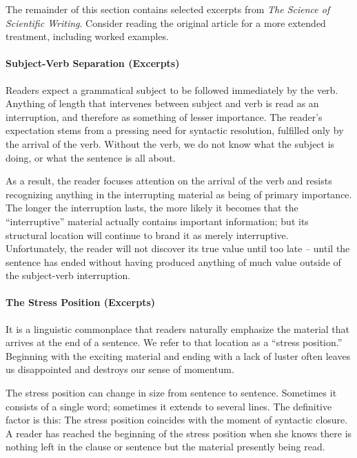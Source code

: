 The remainder of this section contains selected excerpts from \emph{The Science of Scientific Writing}. Consider reading the original article for a more extended treatment, including worked examples.

\paragraph{Subject-Verb Separation (Excerpts)}

  Readers expect a grammatical subject to be followed immediately by the verb. Anything of length that intervenes between subject and verb is read as an interruption, and therefore as something of lesser importance.
The reader’s expectation stems from a pressing need for syntactic resolution, fulfilled only by the arrival of the verb. Without the verb, we do not know what the subject is doing, or what the sentence is all about.

As a result, the reader focuses attention on the arrival of the verb and resists recognizing anything in the interrupting material as being of primary importance.
The longer the interruption lasts, the more likely it becomes that the “interruptive” material actually contains important information; but its structural location will continue to brand it as merely interruptive.
Unfortunately, the reader will not discover its true value until too late – until the sentence has ended without having produced anything of much value outside of the subject-verb interruption.

\paragraph{The Stress Position (Excerpts)}

It is a linguistic commonplace that readers naturally emphasize the material that arrives at the end of a sentence. We refer to that location as a “stress position.”
Beginning with the exciting material and ending with a lack of luster often leaves us disappointed and destroys our sense of momentum.

The stress position can change in size from sentence to sentence. Sometimes it consists of a single word; sometimes it extends to several lines. The definitive factor is this: The stress position coincides with the moment of syntactic closure. A reader has reached the beginning of the stress position when she knows there is nothing left in the clause or sentence but the material presently being read.


